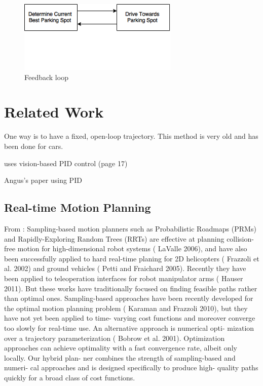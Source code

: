 \begin{figure} %
\centering
\includegraphics[width=3in]{figures/determinedrive1.png}
\caption{Feedback loop}
\label{fig:determinedrive1}
\end{figure}   %

\section{Related Work}
\label{sec:backinginlitreview}
One way is to have a fixed, open-loop trajectory. This method is very old and
has been done for cars.

\cite{sermeno2006vision} uses vision-based PID control (page 17)

Angus's paper using PID

\subsection{Real-time Motion Planning}

From \cite{hauser2013recognition}:
Sampling-based motion planners such as Probabilistic Roadmaps (PRMs) and
Rapidly-Exploring Random Trees (RRTs) are effective at planning collision-free
motion for high-dimensional robot systems ( LaValle 2006), and have also been
successfully applied to hard real-time planing for 2D helicopters ( Frazzoli et
al. 2002) and ground vehicles ( Petti and Fraichard 2005). Recently they have
been applied to teleoperation interfaces for robot manipulator arms ( Hauser
2011). But these works have traditionally focused on finding feasible paths
rather than optimal ones.  Sampling-based approaches have been recently
developed for the optimal motion planning problem ( Karaman and Frazzoli 2010),
but they have not yet been applied to time- varying cost functions and moreover
converge too slowly for real-time use. An alternative approach is numerical
opti- mization over a trajectory parameterization ( Bobrow et al.  2001).
Optimization approaches can achieve optimality with a fast convergence rate,
albeit only locally. Our hybrid plan- ner combines the strength of
sampling-based and numeri- cal approaches and is designed specifically to
produce high- quality paths quickly for a broad class of cost functions.


